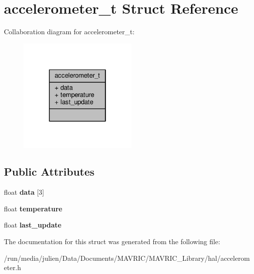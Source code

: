 \hypertarget{structaccelerometer__t}{\section{accelerometer\+\_\+t Struct Reference}
\label{structaccelerometer__t}
}


Collaboration diagram for accelerometer\+\_\+t\+:
\nopagebreak
\begin{figure}[H]
\begin{center}
\leavevmode
\includegraphics[width=166pt]{structaccelerometer__t__coll__graph}
\end{center}
\end{figure}
\subsection*{Public Attributes}
\begin{DoxyCompactItemize}
\item 
\hypertarget{structaccelerometer__t_ab8c236ccbb9008feb2c90de27088a347}{float {\bfseries data} \mbox{[}3\mbox{]}}\label{structaccelerometer__t_ab8c236ccbb9008feb2c90de27088a347}

\item 
\hypertarget{structaccelerometer__t_a81aff940b78e1f3962c5bfb2d13ff0c6}{float {\bfseries temperature}}\label{structaccelerometer__t_a81aff940b78e1f3962c5bfb2d13ff0c6}

\item 
\hypertarget{structaccelerometer__t_a2d9c41713b97f55bb918ae31deaa9e32}{float {\bfseries last\+\_\+update}}\label{structaccelerometer__t_a2d9c41713b97f55bb918ae31deaa9e32}

\end{DoxyCompactItemize}


The documentation for this struct was generated from the following file\+:\begin{DoxyCompactItemize}
\item 
/run/media/julien/\+Data/\+Documents/\+M\+A\+V\+R\+I\+C/\+M\+A\+V\+R\+I\+C\+\_\+\+Library/hal/accelerometer.\+h\end{DoxyCompactItemize}
